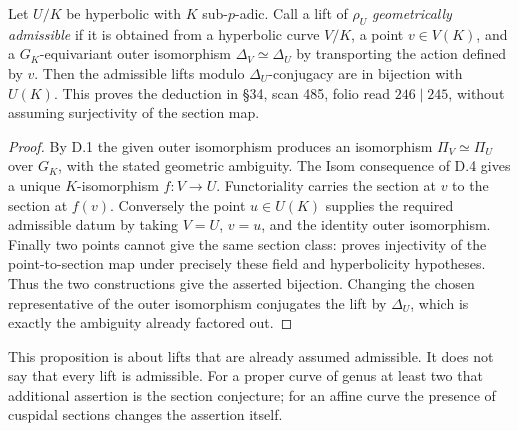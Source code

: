 Let $U/K$ be hyperbolic with $K$ sub-$p$-adic.  Call a lift of $\rho_U$
\emph{geometrically admissible} if it is obtained from a hyperbolic curve $V/K$,
a point $v\in V(K)$, and a $G_K$-equivariant outer isomorphism
$\Delta_V\simeq\Delta_U$ by transporting the action defined by $v$.
Then the admissible lifts modulo $\Delta_U$-conjugacy are in bijection with
$U(K)$.  This proves the deduction in \S34, scan 485, folio read
$246\mid245$, without assuming surjectivity of the section map.
\begin{proof}
By D.1 the given outer isomorphism produces an isomorphism
$\Pi_V\simeq\Pi_U$ over $G_K$, with the stated geometric ambiguity.
The Isom consequence of D.4 gives a unique $K$-isomorphism $f:V\to U$.
Functoriality carries the section at $v$ to the section at $f(v)$.
Conversely the point $u\in U(K)$ supplies the required admissible datum by
taking $V=U$, $v=u$, and the identity outer isomorphism.
Finally two points cannot give the same section class:
\citet[Theorem C = Theorem 19.1]{Mochizuki1999} proves injectivity of the
point-to-section map under precisely these field and hyperbolicity hypotheses.
Thus the two constructions give the asserted bijection.  Changing the chosen
representative of the outer isomorphism conjugates the lift by $\Delta_U$,
which is exactly the ambiguity already factored out.
\end{proof}
This proposition is about lifts that are already assumed admissible.  It does
not say that every lift is admissible.  For a proper curve of genus at least two
that additional assertion is the section conjecture; for an affine curve the
presence of cuspidal sections changes the assertion itself.

